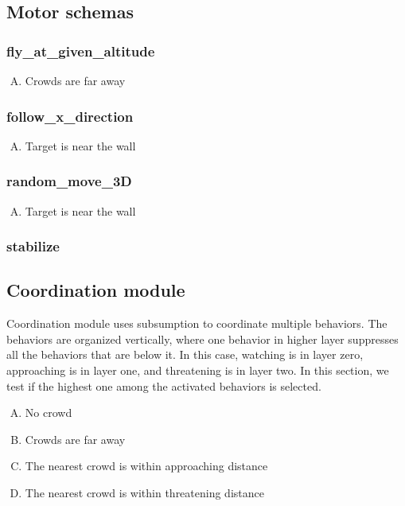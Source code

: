 \subsection{Motor schemas}
\subsubsection{fly\_at\_given\_altitude}
\begin{enumerate}[A.]
\item Crowds are far away
\end{enumerate}

\subsubsection{follow\_x\_direction}
\begin{enumerate}[A.]
\item Target is near the wall
\end{enumerate}

\subsubsection{random\_move\_3D}
\begin{enumerate}[A.]
\item Target is near the wall
\end{enumerate}

\subsubsection{stabilize}

\subsection{Coordination module}
Coordination module uses subsumption to coordinate multiple behaviors. The behaviors are organized vertically, where one behavior in higher layer suppresses all the behaviors that are below it. In this case, watching is in layer zero, approaching is in layer one, and threatening is in layer two. In this section, we test if the highest one among the activated behaviors is selected.

\begin{enumerate}[A.]
\item No crowd
\item Crowds are far away
\item The nearest crowd is within approaching distance
\item The nearest crowd is within threatening distance
\end{enumerate}

